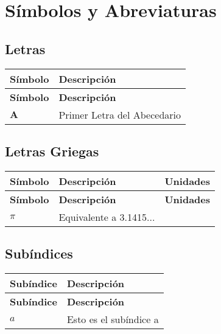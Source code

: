\chapter*{Símbolos y Abreviaturas}
\section*{Letras}
\begin{longtable}{>{\raggedright\arraybackslash}m{}>{\raggedright\arraybackslash}m{}}
	\textbf{Símbolo} & \textbf{Descripción} \\[0.5ex] \hline%
	\endfirsthead%
	\textbf{Símbolo} & \textbf{Descripción} \\[0.5ex] \hline%
	\endhead%
	$\mathbf{A}$ & Primer Letra del Abecedario\\
\end{longtable}

\section*{Letras Griegas}
\begin{longtable}{>{\raggedright\arraybackslash}m{}>{\raggedright\arraybackslash}m{}>{\centering\arraybackslash}m{}}
	\textbf{Símbolo} & \textbf{Descripción} & \textbf{Unidades} \\[0.5ex] \hline%
	\endfirsthead%
	\textbf{Símbolo} & \textbf{Descripción} & \textbf{Unidades} \\[0.5ex] \hline%
	\endhead%
	$\pi$ & Equivalente a 3.1415... & \\
\end{longtable}

\section*{Subíndices}
\begin{longtable}{>{\raggedright\arraybackslash}m{}>{\raggedright\arraybackslash}m{}}
	\textbf{Subíndice} & \textbf{Descripción} \\[0.5ex] \hline%
	\endfirsthead%
	\textbf{Subíndice} & \textbf{Descripción} \\[0.5ex] \hline%
	\endhead%
	$a$ & Esto es el subíndice a\\
\end{longtable}


